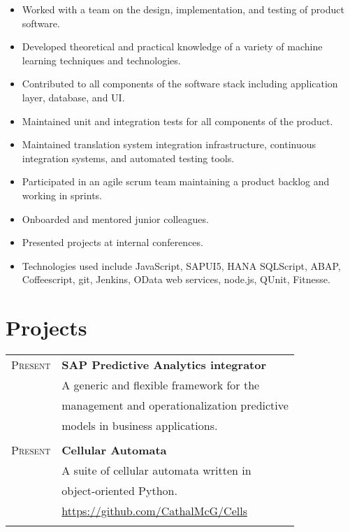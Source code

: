 \documentclass[10pt]{article} %
\begin{document}
{\begin{minipage}[t]{0.5\textwidth}
\normalsize{
\begin{itemize}
\item{Worked with a team on the design, implementation, and testing of product software.}
\item{Developed theoretical and practical knowledge of a variety of machine learning techniques and technologies.}
\item{Contributed to all components of the software stack including application layer, database, and UI.}
\item{Maintained unit and integration tests for all components of the product.}
\item{Maintained translation system integration infrastructure, continuous integration systems, and automated testing tools.}
\item{Participated in an agile scrum team maintaining a product backlog and working in sprints.}
\item{Onboarded and mentored junior colleagues.}
\item{Presented projects at internal conferences.}
\item{Technologies used include JavaScript, SAPUI5, HANA SQLScript, ABAP, Coffeescript, git, Jenkins, OData web services, node.js, QUnit, Fitnesse.}
\end{itemize}
}


\section{Projects}
\begin{tabular}{rl}
\textsc{Present} & \textbf{SAP Predictive Analytics integrator} \\
& A generic and flexible framework for the \\
& management and operationalization predictive \\
& models in business applications. \\ \\

\textsc{Present} & \textbf{Cellular Automata} \\
& A suite of cellular automata written in \\
& object-oriented Python. \\
& \href{https://github.com/CathalMcG/Cells}{https://github.com/CathalMcG/Cells} \\ \\


\end{tabular}
\end{minipage}}
\end{document}
